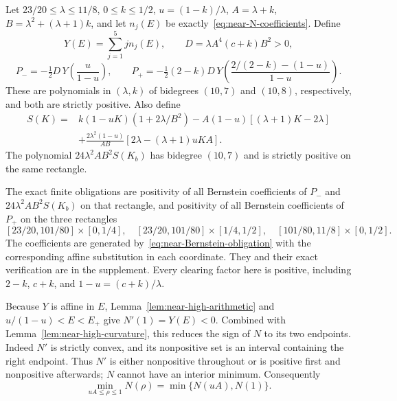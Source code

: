 \begin{lemma}\label{lem:near-high-arithmetic}
Let $23/20\le\lambda\le11/8$, $0\le k\le1/2$, $u=(1-k)/\lambda$, $A=\lambda+k$, $B=\lambda^2+(\lambda+1)k$, and let $n_j(E)$ be exactly~\eqref{eq:near-N-coefficients}. Define
\[
 Y(E)=\sum_{j=1}^5j n_j(E),\qquad
 D=\lambda A^4(c+k)B^2>0,
\]
\[
 P_-=-\tfrac12D\,Y\left(\frac u{1-u}\right),\qquad
 P_+=-\tfrac12(2-k)D\,Y\left(\frac{2/(2-k)-(1-u)}{1-u}\right).
\]
These are polynomials in $(\lambda,k)$ of bidegrees $(10,7)$ and $(10,8)$, respectively, and both are strictly positive. Also define
\begin{equation}\label{eq:near-upper-S}
\begin{split}
 S(K)={}&k(1-uK)(1+2\lambda/B^2)-A(1-u)[(\lambda+1)K-2\lambda]\\
 &+\frac{2\lambda^2(1-u)}{AB}[2\lambda-(\lambda+1)uKA].
\end{split}
\end{equation}
The polynomial $24\lambda^2AB^2S(K_b)$ has bidegree $(10,7)$ and is strictly positive on the same rectangle.

The exact finite obligations are positivity of all Bernstein coefficients of $P_-$ and $24\lambda^2AB^2S(K_b)$ on that rectangle, and positivity of all Bernstein coefficients of $P_+$ on the three rectangles
\[
 [23/20,101/80]\times[0,1/4],\quad
 [23/20,101/80]\times[1/4,1/2],\quad
 [101/80,11/8]\times[0,1/2].
\]
The coefficients are generated by~\eqref{eq:near-Bernstein-obligation} with the corresponding affine substitution in each coordinate. They and their exact verification are in the supplement. Every clearing factor here is positive, including $2-k$, $c+k$, and $1-u=(c+k)/\lambda$.
\end{lemma}

Because $Y$ is affine in $E$, Lemma~\ref{lem:near-high-arithmetic} and
$u/(1-u)<E<E_+$ give $N'(1)=Y(E)<0$. Combined with Lemma~\ref{lem:near-high-curvature}, this reduces the sign of $N$ to its two endpoints. Indeed $N'$ is strictly convex, and its nonpositive set is an interval containing the right endpoint. Thus $N'$ is either nonpositive throughout or is positive first and nonpositive afterwards; $N$ cannot have an interior minimum. Consequently
\begin{equation}\label{eq:near-high-endpoint-reduction}
 \min_{uA\le\rho\le1}N(\rho)=\min\{N(uA),N(1)\}.
\end{equation}

